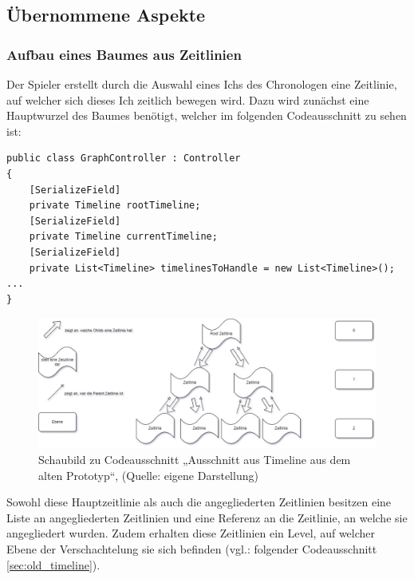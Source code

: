 \subsection{Übernommene Aspekte}
\subsubsection{Aufbau eines Baumes aus Zeitlinien}\label{sec:good_01}
Der Spieler erstellt durch die Auswahl eines Ichs des Chronologen eine Zeitlinie, auf welcher sich dieses Ich zeitlich bewegen wird. Dazu wird zunächst eine Hauptwurzel des Baumes benötigt, welcher im folgenden Codeausschnitt zu sehen ist:
\begin{lstlisting}[caption={Ausschnitt aus GraphController aus dem alten Prototypen}, label={sec:old_graphController}]
public class GraphController : Controller
{
    [SerializeField]
    private Timeline rootTimeline;
    [SerializeField]
    private Timeline currentTimeline;
    [SerializeField]
    private List<Timeline> timelinesToHandle = new List<Timeline>();
...
}
\end{lstlisting}
\label{sec:rootTimeline_pld}

\begin{figure}[ht]
\centering
\includegraphics[width=1\linewidth]{content/pictures/Schaubild Timeline.jpg}
\caption{Schaubild zu Codeausschnitt „Ausschnitt aus Timeline aus dem alten Prototyp“, (Quelle: eigene Darstellung)}
\label{fig:collage_labor_chron}
\end{figure}

Sowohl diese Hauptzeitlinie als auch die angegliederten Zeitlinien besitzen eine Liste an angegliederten Zeitlinien und eine Referenz an die Zeitlinie, an welche sie angegliedert wurden. Zudem erhalten diese Zeitlinien ein Level, auf welcher Ebene der Verschachtelung sie sich befinden (vgl.: folgender Codeausschnitt \ref{sec:old_timeline}).

